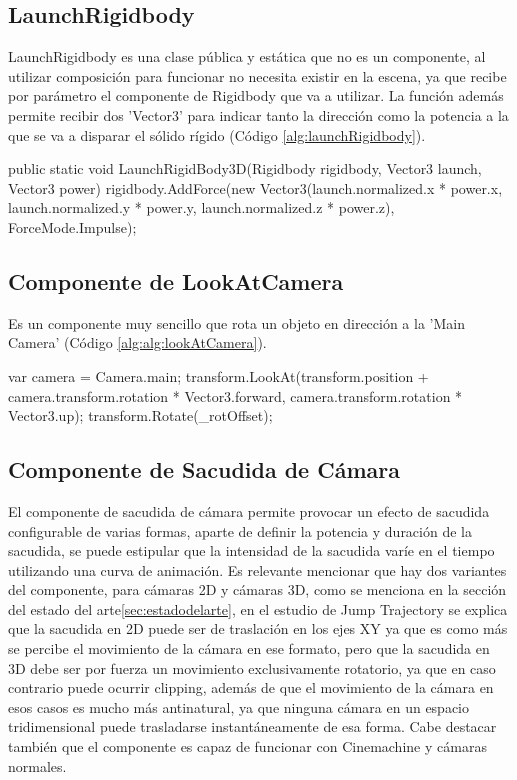 \subsection{LaunchRigidbody}
LaunchRigidbody es una clase pública y estática que no es un componente, al utilizar composición para funcionar no necesita existir en la escena, ya que recibe por parámetro 
el componente de Rigidbody que va a utilizar. La función además permite recibir dos 'Vector3' para indicar tanto la dirección como la potencia a la que se va a disparar el 
sólido rígido (Código \ref{alg:launchRigidbody}).

\begin{mypython}[caption={Funcionamiento de LaunchRigidbody.},label={alg:launchRigidbody}]
    public static void LaunchRigidBody3D(Rigidbody rigidbody, Vector3 launch, Vector3 power)
    {
        rigidbody.AddForce(new Vector3(launch.normalized.x * power.x, launch.normalized.y * power.y, launch.normalized.z * power.z), ForceMode.Impulse);
    }
\end{mypython}
    
\subsection{Componente de LookAtCamera}
Es un componente muy sencillo que rota un objeto en dirección a la 'Main Camera' (Código \ref{alg:alg:lookAtCamera}).

\begin{mypython}[caption={Funcionamiento de LookAtCamera.},label={alg:lookAtCamera}]
    var camera = Camera.main;
    transform.LookAt(transform.position + camera.transform.rotation * Vector3.forward, camera.transform.rotation * Vector3.up);
    transform.Rotate(_rotOffset);
\end{mypython}

\subsection{Componente de Sacudida de Cámara}
El componente de sacudida de cámara permite provocar un efecto de sacudida configurable de varias formas, aparte de definir la potencia y duración de la sacudida, se puede 
estipular que la intensidad de la sacudida varíe en el tiempo utilizando una curva de animación. Es relevante mencionar que hay dos variantes del componente, para cámaras 2D y 
cámaras 3D, como se menciona en la sección del estado del arte\ref{sec:estadodelarte}, en el estudio de Jump Trajectory\cite{Screenshake} se explica que la sacudida en 2D puede 
ser de traslación en los ejes XY ya que es como más se percibe el movimiento de la cámara en ese formato, pero que la sacudida en 3D debe ser por fuerza un movimiento 
exclusivamente rotatorio, ya que en caso contrario puede ocurrir clipping, además de que el movimiento de la cámara en esos casos es mucho más antinatural, ya que ninguna cámara
 en un espacio tridimensional puede trasladarse instantáneamente de esa forma. Cabe destacar también que el componente es capaz de funcionar con Cinemachine y cámaras normales. 

